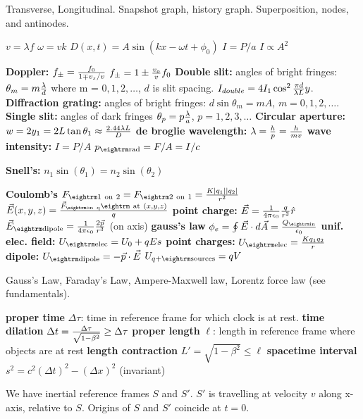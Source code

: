 {

Transverse, Longitudinal.  Snapshot graph, history graph. Superposition, nodes, and antinodes.

$ v = \lambda f$\quad
$ \omega = vk$\quad
$ D(x,t) = A\sin{(kx - \omega t + \phi_0)}$\quad
$ I = P/a$\quad
$ I \propto A^2$\quad

{\bf Doppler: }$ f_{\pm} = {f_0 \over 1 \mp v_s/v}$\quad
$ f_{\pm} = 1 \pm {v_o \over v}f_0 $\quad
{\bf Double slit:} angles of bright fringes: $\theta_m=m{\lambda \over d}$ where m = $0,1,2,\dots$, $d$ is slit spacing.
\quad $I_{double}=4I_1\cos^2{{\pi d \over \lambda L}y}$.\quad
{\bf Diffraction grating:} angles of bright fringes: $d\sin{\theta_m} = mA$, $m=0,1,2,\dots$.\quad
{\bf Single slit:} angles of dark fringes $\theta_p=p{\lambda \over a}$, $p = 1,2,3,\dots$\quad
{\bf Circular aperture:} $w = 2y_1=2L\tan{\theta_1}\approx {2.44\lambda L\over D}$\quad
{\bf de broglie wavelength:} $ \lambda = {h \over p} = {h \over mv}$\quad
{\bf wave intensity:} $I = P/A$ $p_{\rm rad} = F/A = I/c$

{\bf Snell's:} $ n_1\sin(\theta_1) = n_2\sin(\theta_2) $\quad

{\bf Coulomb's} $ F_{\rm 1\ on\ 2} = F_{\rm 2\ on\ 1}={K|q_1||q_2| \over r^2}$\quad
$ \vec{E}(x,y,z) = {\vec{F}_{\rm on\ q}{\rm\ at\ } (x,y,z) \over q} $\quad
{\bf point charge:} $\vec{E} = {1 \over 4\pi\epsilon_0}{q \over r^2}\hat{r}$\quad
$ \vec{E}_{\rm dipole} = {1 \over 4\pi\epsilon_0}{2 \vec{p} \over r^3} $ (on axis)\quad
{\bf gauss's law} $\phi_e = \oint \vec{E}\cdot d\vec{A}={Q_{\rm in} \over \epsilon_0}$\quad
{\bf unif. elec. field:} $U_{\rm elec} = U_0 + qEs $\quad
{\bf point charges:} $U_{\rm elec} = {Kq_1q_2 \over r} $\quad
{\bf dipole:} $U_{\rm dipole} = -\vec{p}\cdot\vec{E} $\quad
$ U_{q + {\rm sources}} = qV $\quad

Gauss's Law, Faraday's Law, Ampere-Maxwell law, Lorentz force law (see fundamentals).

{\bf proper time} $\Delta \tau$: time in reference frame for which clock is at rest.\quad
{\bf time dilation} $\Delta t = {\Delta \tau \over \sqrt{1-\beta^2}} \ge \Delta \tau$\quad
{\bf proper length} $\ell$: length in reference frame where objects are at rest\quad
{\bf length contraction} $L' = \sqrt{1-\beta^2} \le \ell$\quad
{\bf spacetime interval} $s^2 = c^2(\Delta t)^2-(\Delta x)^2$ (invariant)\quad

We have inertial reference frames $S$ and $S'$. $S'$ is travelling at velocity $v$ along x-axis, relative to $S$. Origins of $S$ and $S'$ coincide at $t=0$.

}
